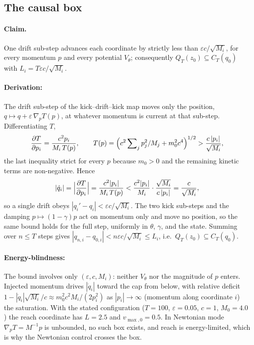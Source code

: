\documentclass{article}
\begin{document}
\subsection{The causal box}
\label{app:deriv:box}
\paragraph{Claim.}
One drift sub-step advances each coordinate by strictly less than $\varepsilon c/\sqrt{M_i}$, for every momentum $p$ and every potential $V_\theta$; consequently $Q_T(z_0)\subseteq C_T(q_0)$ with $L_i=T\varepsilon c/\sqrt{M_i}$.

\paragraph{Derivation:}
The drift sub-step of the kick--drift--kick map moves only the position, $q\mapsto q+\varepsilon\,\nabla_pT(p)$, at whatever momentum is current at that sub-step. Differentiating $T$,
\[
\frac{\partial T}{\partial p_i}=\frac{c^2p_i}{M_i\,T(p)},
\qquad
T(p)=\Bigl(c^2\sum\nolimits_j p_j^2/M_j+m_0^2c^4\Bigr)^{1/2}>\frac{c\,|p_i|}{\sqrt{M_i}},
\]
the last inequality strict for every $p$ because $m_0>0$ and the remaining kinetic terms are non-negative. Hence
\[
|\dot q_i|=\Bigl|\frac{\partial T}{\partial p_i}\Bigr|=\frac{c^2|p_i|}{M_i\,T(p)}<\frac{c^2|p_i|}{M_i}\cdot\frac{\sqrt{M_i}}{c\,|p_i|}=\frac{c}{\sqrt{M_i}},
\]
so a single drift obeys $|q_i'-q_i|<\varepsilon c/\sqrt{M_i}$. The two kick sub-steps and the damping $p\mapsto(1-\gamma)p$ act on momentum only and move no position, so the same bound holds for the full step, uniformly in $\theta$, $\gamma$, and the state. Summing over $n\le T$ steps gives $|q_{n,i}-q_{0,i}|<n\varepsilon c/\sqrt{M_i}\le L_i$, i.e.\ $Q_T(z_0)\subseteq C_T(q_0)$.

\paragraph{Energy-blindness:}
The bound involves only $(\varepsilon,c,M_i)$: neither $V_\theta$ nor the magnitude of $p$ enters. Injected momentum drives $|\dot q_i|$ toward the cap from below, with relative deficit $1-|\dot q_i|\sqrt{M_i}/c\approx m_0^2c^2M_i/(2p_i^2)$ as $|p_i|\to\infty$ (momentum along coordinate $i$) the saturation. With the stated configuration ($T=100$, $\varepsilon=0.05$, $c=1$, $M_0=4.0$) the reach coordinate has $L=2.5$ and $v_{\max,0}=0.5$. In Newtonian mode $\nabla_pT=M^{-1}p$ is unbounded, no such box exists, and reach is energy-limited, which is why the Newtonian control crosses the box.
\end{document}

